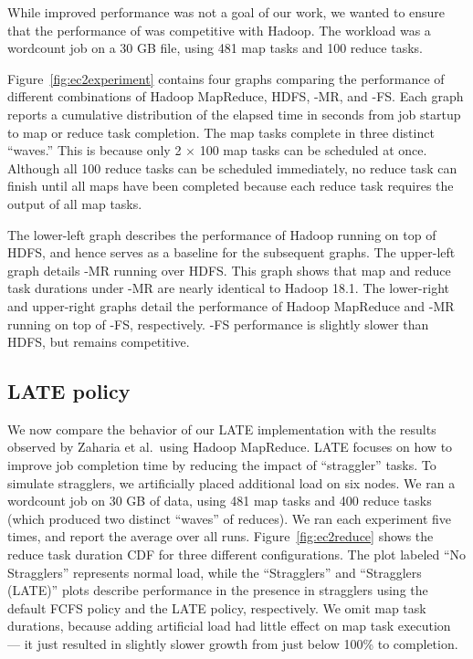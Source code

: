 While improved performance was not a goal of our work, we wanted to
ensure that the performance of \BOOMA was competitive with Hadoop.
The workload was a wordcount job on a 30 GB file, using 481 map tasks 
and 100 reduce tasks.

Figure~\ref{fig:ec2experiment} contains four graphs comparing the performance of
different combinations of Hadoop MapReduce, HDFS, \BOOM-MR, and \BOOM-FS\@. Each
graph reports a cumulative distribution of the elapsed time in seconds from job
startup to map or reduce task completion. The map tasks complete in three
distinct ``waves.'' This is because only 2 $\times$ 100 map tasks can be
scheduled at once. Although all 100 reduce tasks can be scheduled immediately,
no reduce task can finish until all maps have been completed because each reduce
task requires the output of all map tasks.

The lower-left graph describes the performance of Hadoop running on top of HDFS,
and hence serves as a baseline for the subsequent graphs. The upper-left graph
details \BOOM-MR running over HDFS\@. This graph shows that map and reduce task
durations under \BOOM-MR are nearly identical to Hadoop 18.1. The lower-right
and upper-right graphs detail the performance of Hadoop MapReduce and \BOOM-MR
running on top of \BOOM-FS, respectively. \BOOM-FS performance is slightly
slower than HDFS, but remains competitive.


\subsection{LATE policy}

We now compare the behavior of our LATE implementation with the results observed
by Zaharia et al.\ using Hadoop MapReduce. LATE focuses on how to improve job completion time by reducing the impact of
``straggler'' tasks. To simulate stragglers, we artificially placed additional
load on six nodes. We ran a wordcount job on 30 GB of data, using 481 map tasks
and 400 reduce tasks (which produced two distinct ``waves'' of reduces). We ran
each experiment five times, and report the average over all
runs. Figure~\ref{fig:ec2reduce} shows the reduce task duration CDF for three
different configurations. The plot labeled ``No Stragglers'' represents normal
load, while the ``Stragglers'' and ``Stragglers (LATE)'' plots describe
performance in the presence in stragglers using the default FCFS policy and the
LATE policy, respectively. We omit map task durations, because adding artificial
load had little effect on map task execution --- it just resulted in slightly
slower growth from just below 100\% to completion.


